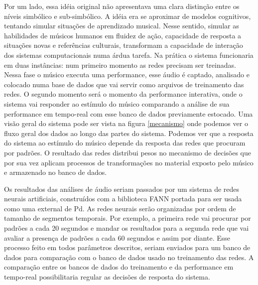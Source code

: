 \documentclass[draft]{ppgmus}
\begin{document}
Por um lado, essa idéia original não apresentava uma clara distinção entre os níveis simbólico e sub-simbólico.
A idéia era se aproximar de modelos cognitivos, tentando simular situações de aprendizado musical.
Nesse sentido, simular as habilidades de músicos humanos em fluidez de ação, capacidade de 
resposta a situações novas e referências culturais, transformam a capacidade de interação dos sistemas computacionais 
numa árdua tarefa. Na prática o sistema funcionaria em duas instâncias: num primeiro momento as redes precisam ser 
treinadas. Nessa fase o músico executa uma performance, esse áudio é captado, analisado e colocado numa base de dados 
que vai servir como arquivos de treinamento das redes. O segundo momento será o momento da performance interativa, 
onde o sistema vai responder ao estímulo do músico comparando a análise de sua performance em tempo-real com esse 
banco de dados previamente estocado. Uma visão geral do sistema pode ser vista na figura \ref{mecanismo} onde podemos ver o fluxo 
geral dos dados ao longo das partes do sistema. Podemos ver que a resposta do sistema ao estímulo do músico depende 
da resposta das redes que procuram por padrões. O resultado das redes distribui pesos no mecanismo de decisões que por 
sua vez aplicam processos de transformações no material exposto pelo músico e armazenado no banco de dados.
   

Os resultados das análises de áudio seriam passados por um sistema de redes neurais artificiais, 
construídos com a biblioteca FANN \cite{fann}  portada para ser usada como uma external de Pd. As redes neurais serão organizadas 
por ordem de tamanho de segmentos temporais. Por exemplo, a primeira rede vai procurar por padrões a cada 20 segundos e 
mandar os resultados para a segunda rede que vai avaliar a presença de padrões a cada 60 segundos e assim por diante. 
Esse processo feito em todos parâmetros descritos, seriam enviados para um banco de dados
 para comparação com o banco de dados usado no treinamento das redes. A comparação entre os bancos de dados do 
treinamento e da performance em tempo-real possibilitaria regular as decisões de resposta do sistema.
\end{document}

